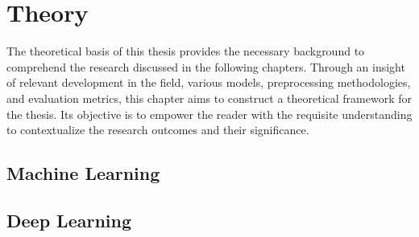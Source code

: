\chapter{Theory}

The theoretical basis of this thesis provides the necessary background to comprehend the research discussed in the following chapters. Through an insight of relevant development in the field, various models, preprocessing methodologies, and evaluation metrics, this chapter aims to construct a theoretical framework for the thesis. Its objective is to empower the reader with the requisite understanding to contextualize the research outcomes and their significance.

\section{Machine Learning}

\Blindtext[4][1]

\section{Deep Learning}

\Blindtext[4][1]
